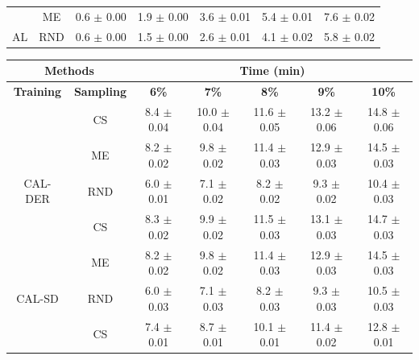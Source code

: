 \begin{table}[htbp]
\begin{tabular*}{\linewidth}{c|c|@{\extracolsep{\fill}}ccccc}
 & ME & 0.6 $\pm$ {\small 0.00} & 1.9 $\pm$ {\small 0.00} & 3.6 $\pm$ {\small 0.01} & 5.4 $\pm$ {\small 0.01} & 7.6 $\pm$ {\small 0.02}\\

\multirow{-3}{*}{\raggedright\arraybackslash AL} & RND & 0.6 $\pm$ {\small 0.00} & 1.5 $\pm$ {\small 0.00} & 2.6 $\pm$ {\small 0.01} & 4.1 $\pm$ {\small 0.02} & 5.8 $\pm$ {\small 0.02}\\
\bottomrule
\end{tabular*}
\vspace{0.5em}

\begin{tabular*}{\linewidth}{c|c|@{\extracolsep{\fill}}ccccc}
\toprule
\multicolumn{2}{c|}{\textbf{Methods}} & \multicolumn{5}{c}{\textbf{Time (min)}} \\
\midrule
\textbf{Training} & \textbf{Sampling} & \textbf{6\%} & \textbf{7\%} & \textbf{8\%} & \textbf{9\%} & \textbf{10\%}\\
\midrule
 & CS & 8.4 $\pm$ {\small 0.04} & 10.0 $\pm$ {\small 0.04} & 11.6 $\pm$ {\small 0.05} & 13.2 $\pm$ {\small 0.06} & 14.8 $\pm$ {\small 0.06}\\

 & ME & 8.2 $\pm$ {\small 0.02} & 9.8 $\pm$ {\small 0.02} & 11.4 $\pm$ {\small 0.03} & 12.9 $\pm$ {\small 0.03} & 14.5 $\pm$ {\small 0.03}\\

\multirow{-3}{*}{\raggedright\arraybackslash CAL-DER} & RND & 6.0 $\pm$ {\small 0.01} & 7.1 $\pm$ {\small 0.02} & 8.2 $\pm$ {\small 0.02} & 9.3 $\pm$ {\small 0.02} & 10.4 $\pm$ {\small 0.03}\\
\midrule
 & CS & 8.3 $\pm$ {\small 0.02} & 9.9 $\pm$ {\small 0.02} & 11.5 $\pm$ {\small 0.03} & 13.1 $\pm$ {\small 0.03} & 14.7 $\pm$ {\small 0.03}\\

 & ME & 8.2 $\pm$ {\small 0.02} & 9.8 $\pm$ {\small 0.02} & 11.4 $\pm$ {\small 0.03} & 12.9 $\pm$ {\small 0.03} & 14.5 $\pm$ {\small 0.03}\\

\multirow{-3}{*}{\raggedright\arraybackslash CAL-SD} & RND & 6.0 $\pm$ {\small 0.03} & 7.1 $\pm$ {\small 0.03} & 8.2 $\pm$ {\small 0.03} & 9.3 $\pm$ {\small 0.03} & 10.5 $\pm$ {\small 0.03}\\
\midrule
 & CS & 7.4 $\pm$ {\small 0.01} & 8.7 $\pm$ {\small 0.01} & 10.1 $\pm$ {\small 0.01} & 11.4 $\pm$ {\small 0.02} & 12.8 $\pm$ {\small 0.01}\\


\end{tabular*}
\end{table}
